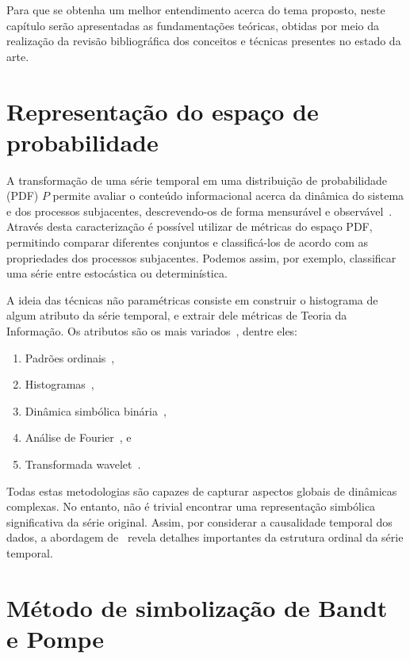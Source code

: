 
Para que se obtenha um melhor entendimento acerca do tema proposto, neste  capítulo  serão  apresentadas  as  fundamentações  teóricas, obtidas por meio da realização da revisão bibliográfica dos conceitos e técnicas presentes no estado da arte.

\section{Representação do espaço de probabilidade}

A transformação de uma série temporal em uma distribuição de probabilidade (PDF) $P$ permite avaliar o conteúdo informacional acerca da dinâmica do sistema e dos processos subjacentes, descrevendo-os de forma mensurável e observável~\citep{entropyAndInformationTheory}.
Através desta caracterização é possível utilizar de métricas do espaço PDF, permitindo comparar diferentes conjuntos e classificá-los de acordo com as propriedades dos processos subjacentes. 
Podemos assim, por exemplo, classificar uma série entre estocástica ou determinística.

A ideia das técnicas não paramétricas consiste em construir o histograma de algum atributo da série temporal, e extrair dele métricas de Teoria da Informação.
Os atributos são os mais variados~\citep{Kowalski2011DistancesIP}, dentre eles: 
\begin{enumerate}[label=(\alph*)]
\item Padrões ordinais~\citep{ROSSO2},
\item Histogramas~\citep{article3,DEMICCO20083373},
\item Dinâmica simbólica binária~\citep{PhysRevLett},
\item Análise de Fourier~\citep{article}, e 
\item Transformada wavelet~\citep{ROSSO3}. 
\end{enumerate}

Todas estas metodologias são capazes de capturar aspectos globais de dinâmicas complexas. 
No entanto, não é trivial encontrar uma representação simbólica significativa da série original. 
Assim, por considerar a causalidade temporal dos dados, a abordagem de~\citet{article2} revela detalhes importantes da estrutura ordinal da série temporal.

\section{Método de simbolização de Bandt e Pompe }

